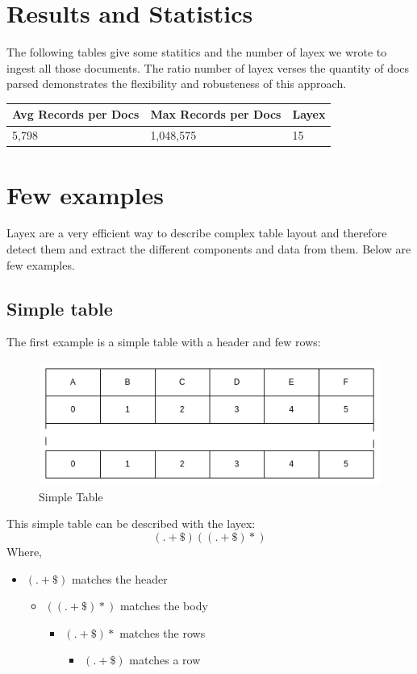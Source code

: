 \documentclass{article}
\begin{document}
\section{Results and Statistics}
The following tables give some statitics and the number of layex we wrote to ingest all those documents. The ratio number
of layex verses the quantity of docs parsed demonstrates the flexibility and robusteness of this approach.
\begin{table}[H]
\centering
\begin{tabular}{|l|l|l|}
\hline
Avg Records per Docs & Max Records per Docs  & Layex  \\
\hline
5,798                & 1,048,575             & 15     \\
\hline
\end{tabular}
\end{table}

\section{Few examples}
Layex are a very efficient way to describe complex table layout and therefore detect them and extract the different
components and data from them. Below are few examples.

\subsection{Simple table}
The first example is a simple table with a header and few rows:
\begin{figure}[H]
\caption{Simple Table}
\includegraphics[width=\columnwidth]{simple_table.drawio}
\end{figure}
This simple table can be described with the layex:
\[(.+\$)((.+\$)*)\]
Where,
\begin{itemize}
    \item $(.+\$)$ matches the header
    \begin{itemize}
        \item $((.+\$)*)$ matches the body
        \begin{itemize}
            \item $(.+\$)*$ matches the rows
            \begin{itemize}
                \item $(.+\$)$ matches a row
            \end{itemize}
        \end{itemize}
    \end{itemize}
\end{itemize}
\end{document}

